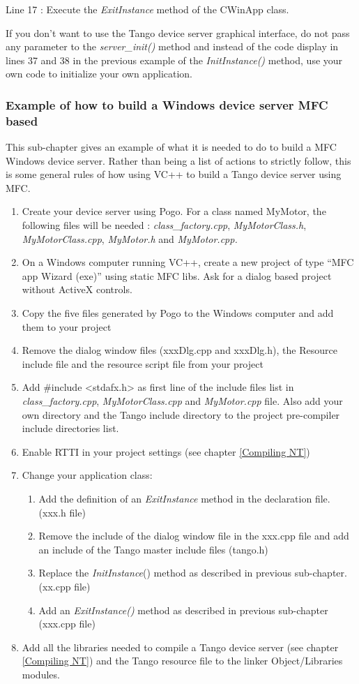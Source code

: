 Line 17 : Execute the \emph{ExitInstance} method of the CWinApp class.

If you don't want to use the Tango device server graphical interface,
do not pass any parameter to the \emph{server\_init()}
method and instead of the code display in lines 37 and 38 in the previous
example of the \emph{InitInstance()} method, use your own code to
initialize your own application.

\subsubsection{Example of how to build a Windows device server MFC based}

This sub-chapter gives an example of what it is needed to do to build
a MFC Windows device server. Rather than being a list of actions to
strictly follow, this is some general rules of how using VC++ to build
a Tango device server using MFC.
\begin{enumerate}
\item Create your device server using Pogo. For a class named MyMotor, the
following files will be needed : \emph{class\_factory.cpp}, \emph{MyMotorClass.h},
\emph{MyMotorClass.cpp}, \emph{MyMotor.h} and \emph{MyMotor.cpp.}
\item On a Windows computer running VC++, create a new project of type ``MFC
app Wizard (exe)'' using static MFC libs. Ask for a dialog
based project without ActiveX controls.
\item Copy the five files generated by Pogo to the Windows computer and
add them to your project
\item Remove the dialog window files (xxxDlg.cpp and xxxDlg.h), the Resource
include file and the resource script file from your project
\item Add \#include <stdafx.h> as first line of the include files list in
\emph{class\_factory.cpp}, \emph{MyMotorClass.cpp} and \emph{MyMotor.cpp}
file. Also add your own directory and the Tango include directory
to the project pre-compiler include directories list.
\item Enable RTTI in your project settings (see chapter \ref{Compiling NT})
\item Change your application class: 

\begin{enumerate}
\item Add the definition of an \emph{ExitInstance} method in the declaration
file. (xxx.h file)
\item Remove the include of the dialog window file in the xxx.cpp file and
add an include of the Tango master include files (tango.h)
\item Replace the \emph{InitInstance}() method as described in previous
sub-chapter. (xx.cpp file)
\item Add an \emph{ExitInstance()} method as described in previous sub-chapter
(xxx.cpp file)
\end{enumerate}
\item Add all the libraries needed to compile a Tango device server (see
chapter \ref{Compiling NT}) and the Tango resource file to the linker
Object/Libraries modules.
\end{enumerate}

